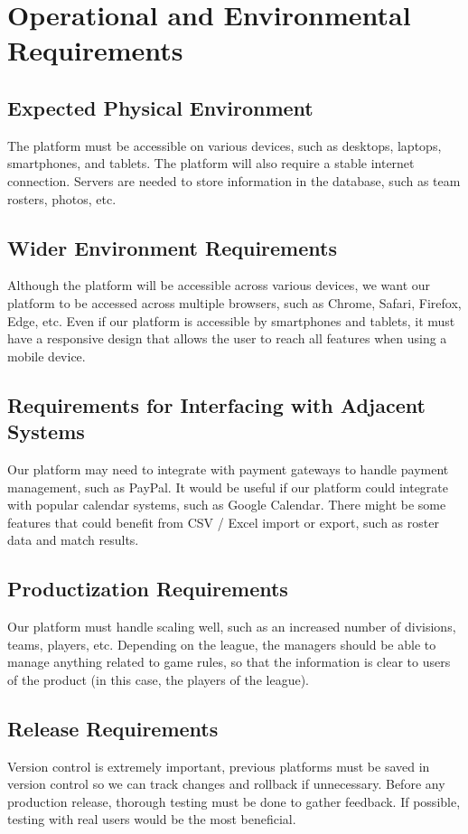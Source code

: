 \documentclass[12pt]{article}
\begin{document}
\section{Operational and Environmental Requirements}
\subsection{Expected Physical Environment}
The platform must be accessible on various devices, such as desktops, laptops, smartphones, and tablets.
The platform will also require a stable internet connection.
Servers are needed to store information in the database, such as team rosters, photos, etc.

\subsection{Wider Environment Requirements}
Although the platform will be accessible across various devices, we want our platform to be accessed across multiple browsers, such as Chrome, Safari, Firefox, Edge, etc.
Even if our platform is accessible by smartphones and tablets, it must have a responsive design that allows the user to reach all features when using a mobile device.

\subsection{Requirements for Interfacing with Adjacent Systems}
Our platform may need to integrate with payment gateways to handle payment management, such as PayPal.
It would be useful if our platform could integrate with popular calendar systems, such as Google Calendar.
There might be some features that could benefit from CSV / Excel import or export, such as roster data and match results.

\subsection{Productization Requirements}
Our platform must handle scaling well, such as an increased number of divisions, teams, players, etc.
Depending on the league, the managers should be able to manage anything related to game rules, so that the information is clear to users of the product (in this case, the players of the league).

\subsection{Release Requirements}
Version control is extremely important, previous platforms must be saved in version control so we can track changes and rollback if unnecessary.
Before any production release, thorough testing must be done to gather feedback. If possible, testing with real users would be the most beneficial.
\end{document}

